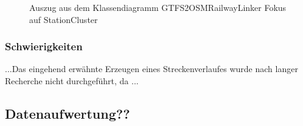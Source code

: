 \begin{figure}[htb]
   \centering
   \caption{Auszug aus dem Klassendiagramm GTFS2OSMRailwayLinker Fokus auf StationCluster}
   \label{fig:gtfs2osm:uml_stationcluster}
 \end{figure}

\subsubsection{Schwierigkeiten}

...Das eingehend erwähnte Erzeugen eines Streckenverlaufes wurde nach langer Recherche nicht durchgeführt, da ...

\subsection{Datenaufwertung??}

